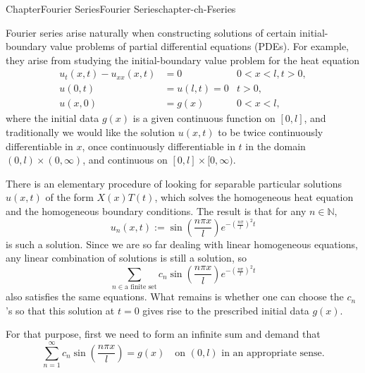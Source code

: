 \documentclass[oneside,10pt,]{book}
\numberwithin{equation}{section}
\newcommand{\lt}{<}
\newcommand{\amp}{&}
\begin{document}
%
%
\typeout{************************************************}
\typeout{************************************************}
%
\begin{chapterptx}{Chapter}{Fourier Series}{}{Fourier Series}{}{}{chapter-ch-Fseries}
\renewcommand*{\chaptername}{Chapter}
\begin{introduction}{}%
Fourier series arise naturally when constructing solutions of certain initial-boundary value problems of partial differential equations (PDEs).  For example, they arise from studying the initial-boundary value problem for the heat equation%
\begin{align*}
u_t(x,t)-u_{xx}(x,t) \amp = 0 \amp 0\lt x \lt l, t>0,\\
u(0,t)\amp =u(l,t)=0 \amp t>0,\\
u(x, 0)\amp =g(x) \amp 0\lt x \lt l, 
\end{align*}
where the initial data \(g(x)\) is a given continuous function on \([0, l]\), and traditionally we would like the solution \(u(x, t)\) to be twice continuously differentiable in \(x\), once continuously differentiable in \(t\) in the domain \((0, l)\times (0,\infty)\), and continuous on \([0, l]\times [0,\infty)\).%
\par
There is an elementary procedure of looking for separable particular solutions \(u(x, t)\) of the form \(X(x)T(t)\), which solves the homogeneous heat equation and the homogeneous boundary conditions. The result is that for any \(n\in \mathbb N\),%
\begin{equation*}
u_{n}(x, t) := \sin \left(\frac{n \pi x}{l}\right) e^{- \left(\frac{n \pi}{l}\right)^2 t}
\end{equation*}
is such a solution. Since we are so far dealing with linear homogeneous equations, any linear combination of solutions is still a solution, so%
\begin{equation*}
\sum_{n \in \text{a finite set}} c_n \sin \left(\frac{n \pi x}{l}\right) e^{- \left(\frac{n \pi}{l}\right)^2 t}
\end{equation*}
also satisfies the same equations.  What remains is whether one can choose the \(c_{n}\)'s so that this solution at \(t=0\) gives rise to the prescribed initial data \(g(x)\).%
\par
For that purpose, first we need to form an infinite sum and demand that%
\begin{equation}
\sum_{n=1}^{\infty} c_n \sin \left(\frac{n \pi x}{l} \right)= g(x) \quad \text{on } (0,l)  
\text{ in an appropriate sense}.\label{men-Fsine}

\end{equation}
\end{introduction}
\end{chapterptx}
\end{document}
